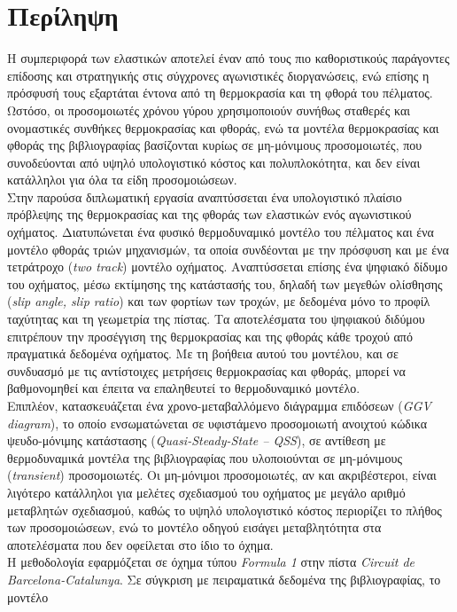 \section*{Περίληψη}


\noindent
Η συμπεριφορά των ελαστικών αποτελεί έναν από τους πιο καθοριστικούς παράγοντες επίδοσης και στρατηγικής στις σύγχρονες
αγωνιστικές διοργανώσεις, ενώ επίσης η πρόσφυσή τους εξαρτάται έντονα από τη θερμοκρασία και τη φθορά του
πέλματος. Ωστόσο, οι προσομοιωτές χρόνου γύρου χρησιμοποιούν
συνήθως σταθερές και ονομαστικές συνθήκες θερμοκρασίας και
φθοράς, ενώ τα μοντέλα θερμοκρασίας και φθοράς της βιβλιογραφίας βασίζονται κυρίως σε μη-μόνιμους
προσομοιωτές, που συνοδεύονται από υψηλό υπολογιστικό κόστος και πολυπλοκότητα, και δεν είναι κατάλληλοι για όλα τα είδη προσομοιώσεων.\\[8pt]
\noindent
Στην παρούσα διπλωματική εργασία αναπτύσσεται ένα υπολογιστικό πλαίσιο πρόβλεψης της θερμοκρασίας και της φθοράς των ελαστικών ενός αγωνιστικού οχήματος.
Διατυπώνεται ένα
φυσικό θερμοδυναμικό μοντέλο του πέλματος και ένα μοντέλο φθοράς τριών μηχανισμών, τα οποία συνδέονται με
την πρόσφυση και με ένα τετράτροχο (\textit{two track}) μοντέλο οχήματος. Αναπτύσσεται επίσης ένα ψηφιακό δίδυμο του οχήματος, μέσω εκτίμησης της κατάστασής του, δηλαδή των μεγεθών ολίσθησης (\textit{slip angle, slip ratio})
και των φορτίων των τροχών, με δεδομένα μόνο το προφίλ ταχύτητας και τη γεωμετρία της πίστας.
Τα αποτελέσματα του ψηφιακού διδύμου επιτρέπουν την προσέγγιση της θερμοκρασίας και της φθοράς κάθε τροχού από πραγματικά δεδομένα οχήματος. Με τη βοήθεια αυτού του μοντέλου, και σε συνδυασμό με τις αντίστοιχες μετρήσεις θερμοκρασίας και φθοράς, μπορεί να βαθμονομηθεί και έπειτα να επαληθευτεί το θερμοδυναμικό μοντέλο.\\[8pt]
Επιπλέον, κατασκευάζεται ένα χρονο-μεταβαλλόμενο διάγραμμα επιδόσεων (\textit{GGV diagram}), το οποίο ενσωματώνεται σε
υφιστάμενο προσομοιωτή ανοιχτού κώδικα ψευδο-μόνιμης κατάστασης (\textit{Quasi-Steady-State -- QSS}),
σε αντίθεση με θερμοδυναμικά μοντέλα της βιβλιογραφίας που υλοποιούνται σε μη-μόνιμους (\textit{transient}) προσομοιωτές. Οι μη-μόνιμοι προσομοιωτές, αν και ακριβέστεροι, είναι λιγότερο κατάλληλοι για μελέτες σχεδιασμού του οχήματος με μεγάλο αριθμό μεταβλητών σχεδιασμού, καθώς το υψηλό υπολογιστικό κόστος περιορίζει το πλήθος των προσομοιώσεων, ενώ το μοντέλο οδηγού εισάγει μεταβλητότητα στα αποτελέσματα που δεν οφείλεται στο ίδιο το όχημα.
\\[8pt]
Η μεθοδολογία εφαρμόζεται σε όχημα τύπου \textit{Formula 1} στην πίστα \textit{Circuit de
Barcelona-Catalunya}. Σε σύγκριση με πειραματικά δεδομένα της βιβλιογραφίας, το μοντέλο
